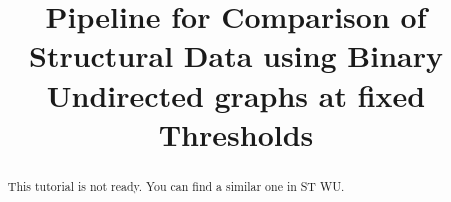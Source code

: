\documentclass[justified]{tufte-handout}
\title{Pipeline for Comparison of Structural Data using Binary Undirected graphs at fixed Thresholds}
\begin{document}
\maketitle

\begin{abstract}
\noindent
This tutorial is not ready. You can find a similar one in ST WU.
\end{abstract}
\end{document}
